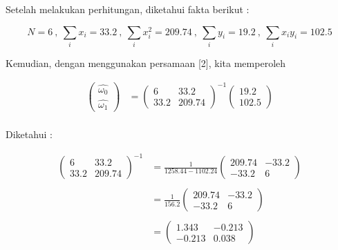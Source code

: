 \documentclass[12pt]{article}%
\begin{document}
\begin{enumerate}
\begin{enumerate}
		\par Setelah melakukan perhitungan, diketahui fakta berikut :

			\[N = 6 \ , \ \sum_i x_i = 33.2 \ , \ \sum_i x_i^2 = 209.74 \ , \ \sum_i y_i = 19.2 \ , \ \sum_i x_i y_i = 102.5\]

		\par Kemudian, dengan menggunakan persamaan [2], kita memperoleh 

			\begin{align*}
				\begin{pmatrix} \hat{\omega_0} \\ \hat{\omega_1} \end{pmatrix} & = \begin{pmatrix} 6 & 33.2\\ 33.2 & 209.74\end{pmatrix}^{-1} \begin{pmatrix} 19.2\\ 102.5 \end{pmatrix} \\
			\end{align*}

		\par Diketahui :

			\begin{align*}
				\begin{pmatrix} 6 & 33.2\\ 33.2 & 209.74 \end{pmatrix} ^{-1} & = \frac{1}{1258.44-1102.24} \begin{pmatrix} 209.74 & -33.2\\ -33.2 & 6 \end{pmatrix} \\ \\
				& = \frac{1}{156.2} \begin{pmatrix} 209.74 & -33.2\\ -33.2 & 6 \end{pmatrix} \\ \\
				& = \begin{pmatrix} 1.343 & -0.213\\ -0.213 & 0.038 \end{pmatrix}
			\end{align*}


\end{enumerate}
\end{enumerate}
\end{document}
